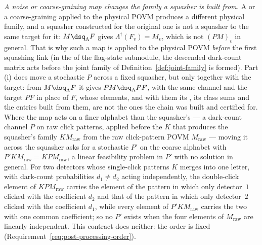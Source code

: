 \begin{remark}
\emph{A noise or coarse-graining map changes the family a squasher is built
from.} A  or a coarse-graining applied to the
physical POVM produces a different physical family, and a squasher
constructed for the original one is not a squasher to the same target for it:
$M\dsq_{\Lambda}F$ gives $\Lambda^{\dagger}(F_v)=M_v$, which is not $(PM)_v$
in general. That is why such a map is applied to the physical POVM
\emph{before} the first squashing link (in the  of the
flag-state submodule, the descended dark-count matrix acts before the joint
family of Definition~\ref{def:joint-family} is formed). Part (i) does move a
stochastic $P$ across a fixed squasher, but only together with the target:
from $M\dsq_{\Lambda}F$ it gives $PM\dsq_{\Lambda}PF$, with the same channel
and the target $PF$ in place of $F$, whose elements, and with them its
, its class sums and the entries built from
them, are not the ones the chain was built and certified for. Where the map
acts on a finer alphabet than the squasher's --- a dark-count channel $P$ on
raw click patterns, applied before the  $K$
that produces the
squasher's family $KM_{\mathrm{raw}}$ from the raw click-pattern POVM
$M_{\mathrm{raw}}$ --- moving it across the squasher asks for a stochastic
$P'$ on the coarse alphabet with $P'KM_{\mathrm{raw}}=KPM_{\mathrm{raw}}$, a
linear feasibility problem in $P'$ with no solution in general. For two
detectors whose single-click patterns $K$ merges into one letter, with
dark-count probabilities $d_1\ne d_2$ acting independently, the double-click
element of $KPM_{\mathrm{raw}}$ carries the element of the pattern in which
only detector~$1$ clicked with the coefficient $d_2$ and that of the pattern
in which only detector~$2$ clicked with the coefficient $d_1$, while every
element of $P'KM_{\mathrm{raw}}$ carries the two with one common
coefficient; so no $P'$ exists when the four elements of $M_{\mathrm{raw}}$
are linearly independent. This contract does neither: the order is fixed
(Requirement~\ref{req:post-processing-order}).


\end{remark}
